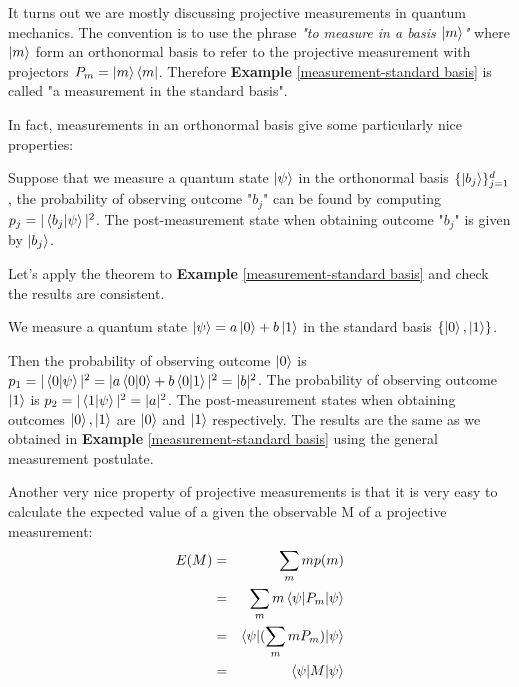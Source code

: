 It turns out we are mostly discussing projective measurements in quantum mechanics. The convention is to use the phrase \textit{"to measure in a basis $\ket{m}$"} where $\ket{m}$ form an orthonormal basis to refer to the projective measurement with projectors $P_m=\ket{m}\bra{m}$. Therefore \textbf{Example} \ref{measurement-standard basis} is called "a measurement in the standard basis". 

\bigskip

In fact, measurements in an orthonormal basis give some particularly nice properties:
\begin{theorem}
 Suppose that we measure a quantum state $\ket{\psi}$ in the orthonormal basis $\{\ket{b_j}\}_{j=1}^d$, the probability of observing outcome "$b_j$" can be found by computing $p_j=|\braket{b_j|\psi}|^2$. The post-measurement state when obtaining outcome "$b_j$" is given by $\ket{b_j}$.
\end{theorem}

Let's apply the theorem to \textbf{Example} \ref{measurement-standard basis} and check the results are consistent.
\begin{example}
We measure a quantum state $\ket{\psi}=a\ket{0}+b\ket{1}$ in the standard basis $\{\ket{0},\ket{1}\}$.

Then the probability of observing outcome $\ket{0}$ is $p_1=|\braket{0|\psi}|^2=|a\braket{0|0}+b\braket{0|1}|^2=|b|^2$. The probability of observing outcome $\ket{1}$ is $p_2=|\braket{1|\psi}|^2=|a|^2$. The post-measurement states when obtaining outcomes $\ket{0}, \ket{1}$ are $\ket{0}$ and $\ket{1}$ respectively. The results are the same as we obtained in \textbf{Example} \ref{measurement-standard basis} using the general measurement postulate.
\end{example}

Another very nice property of projective measurements is that it is very easy to calculate the expected value of a given the observable M of a projective measurement:
\begin{eqnarray}
E(M)&=&\sum_m mp(m)\\
&=&\sum_m m \braket{\psi|P_m|\psi}\\
&=&\braket{\psi|(\sum_m mP_m)|\psi}\\
&=&\braket{\psi|M|\psi}
\end{eqnarray}


